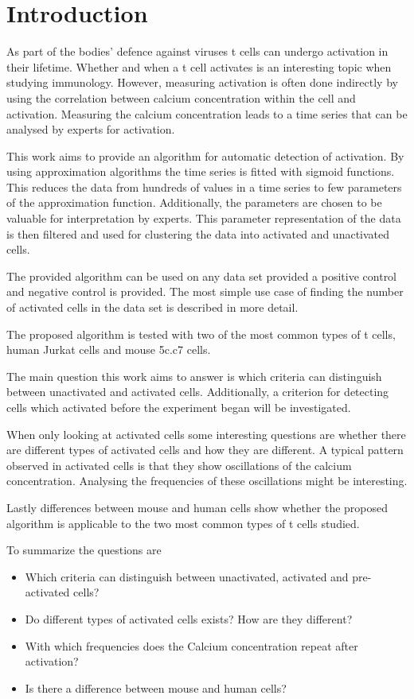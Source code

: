 \chapter{Introduction}
\label{chapter:introduction}

As part of the bodies' defence against viruses t cells can undergo activation in their lifetime. Whether and when a t cell activates is an interesting topic when studying immunology. However, measuring activation is often done indirectly by using the correlation between calcium concentration within the cell and activation. Measuring the calcium concentration leads to a time series that can be analysed by experts for activation.

This work aims to provide an algorithm for automatic detection of activation. By using approximation algorithms the time series is fitted with sigmoid functions. This reduces the data from hundreds of values in a time series to few parameters of the approximation function. Additionally, the parameters are chosen to be valuable for interpretation by experts. This parameter representation of the data is then filtered and used for clustering the data into activated and unactivated cells.

The provided algorithm can be used on any data set provided a positive control and negative control is provided. The most simple use case of finding the number of activated cells in the data set is described in more detail.

The proposed algorithm is tested with two of the most common types of t cells, human Jurkat cells and mouse 5c.c7 cells.

\vspace*{0.7cm}
\noindent
The main question this work aims to answer is which criteria can distinguish between unactivated and activated cells. Additionally, a criterion for detecting cells which activated before the experiment began will be investigated.

When only looking at activated cells some interesting questions are whether there are different types of activated cells and how they are different. A typical pattern observed in activated cells is that they show oscillations of the calcium concentration. Analysing the frequencies of these oscillations might be interesting.

Lastly differences between mouse and human cells show whether the proposed algorithm is applicable to the two most common types of t cells studied.

To summarize the questions are
\begin{itemize}
	\item Which criteria can distinguish between unactivated, activated and pre-activated cells?
	\item Do different types of activated cells exists? How are they different?
	\item With which frequencies does the Calcium concentration repeat after activation?
	\item Is there a difference between mouse and human cells?
\end{itemize}

